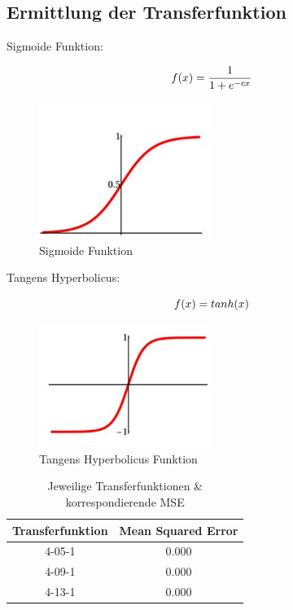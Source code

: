 \documentclass[a4paper,DIV11,bibliography=totoc,headings=normal,ngerman,headsepline,listof=totoc,parskip=half]{scrreprt}
\newcommand*{\formelentry}[1]{\addcontentsline{for}{formel}{\protect\numberline{Formel~\theequation} #1}}
\begin{document}
\subsection{Ermittlung der Transferfunktion} %

Sigmoide Funktion:

\begin{equation}\formelentry{Sigmoide Funktion}
f(x)= \frac{1}{1+e^{-cx}}
\end{equation}

\begin{figure}[htbp]
\centering
		\includegraphics[width=0.5\textwidth]{Sigmoid.PNG}
	\caption{Sigmoide Funktion}
	\label{fig:Sigmoide Funktion}
\end{figure}

Tangens Hyperbolicus:

\begin{equation}\formelentry{Tanh Funktion}
f(x)= tanh(x)
\end{equation}

\begin{figure}[htbp]
\centering
		\includegraphics[width=0.5\textwidth]{tanh.PNG}
	\caption{Tangens Hyperbolicus Funktion}
	\label{fig:Tangens Hyperbolicus Funktion}
\end{figure}

\begin{table}
  \centering
  \begin{tabular}{|c|c|}
  \hline 
  \rule[0ex]{0pt}{2.5ex} Transferfunktion & Mean Squared Error \\ 
  \hline 
  \rule[0ex]{0pt}{2.5ex} 4-05-1 & 0.000 \\ 
  \hline 
  \rule[0ex]{0pt}{2.5ex} 4-09-1 & 0.000 \\ 
  \hline 
  \rule[0ex]{0pt}{2.5ex} 4-13-1 & 0.000 \\ 
  \hline 
  \end{tabular} 
  \caption{Jeweilige Transferfunktionen \& korrespondierende MSE}
  \label{tab:tab2}
\end{table}
\end{document}
